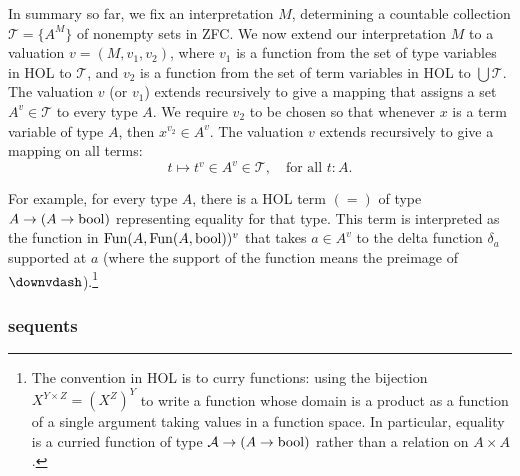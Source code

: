 \documentclass[brochure,english,12pt]{bourbaki}
\theoremstyle{plain}
\def\A{{\mathcal A}}
\def\T{{\mathcal T}}
\begin{document}
In summary so far,
we fix an interpretation $M$, determining a countable collection $\T =\{A^M\}$ of nonempty sets in 
ZFC.  
We now extend our interpretation $M$ to a valuation $v=(M,v_1,v_2)$, where $v_1$ is a function
from the set of type variables in HOL to $\T$, and $v_2$ is a function from the set of term
variables in HOL to $\bigcup\T$.
The valuation $v$ (or $v_1$) extends recursively to give a mapping that assigns
a set $A^{v}\in \T$ to every type $A$.  We require $v_2$ to be chosen so that whenever $x$ is a term variable of type $A$,
then $x^{v_2} \in A^v$.  The valuation $v$ extends recursively to give a mapping on all terms:
\[
t\mapsto t^v \in A^v \in \T, \quad \text{for all } t:A.
\]

For example,
for every type $A$,
there is a HOL term $(=)$ of type $A\to (A\to {\operatorname{bool}})$ representing equality for that type. 
This term is interpreted
as the function in ${\operatorname{Fun}}(A,{\operatorname{Fun}}(A,{\operatorname{bool}}))^{v}$ that
takes $a\in A^{v}$ to the delta function $\delta_a$ supported at $a$
(where the support of the function means 
the preimage of $\downvdash$).\footnote{The convention in HOL is to curry functions: using the bijection
$X^{Y \times Z} = (X^Z)^Y$ to write a function whose domain is a product as a function
of a single argument taking values in a function space. In particular, 
equality is a curried function of type $\A\to (A \to\bool)$
rather than a relation on $A\times A$.}


\subsubsection{sequents}
\end{document}
